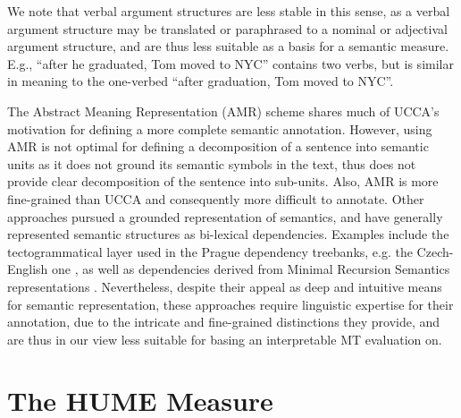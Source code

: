 \documentclass[11pt]{article}
\newcommand{\oa}[1]{\footnote{\color{red}OA: #1}}
\def\parcite#1{\cite{#1}}
\begin{document}
We note that verbal argument structures are less stable in this sense, as a verbal
argument structure may be translated or paraphrased to a nominal or adjectival
argument structure, and are thus less suitable as a basis for a semantic measure.
E.g., ``after he graduated, Tom moved to NYC'' contains two verbs,
but is similar in meaning to the one-verbed
``after graduation, Tom moved to NYC''. 


The Abstract Meaning Representation (AMR) scheme \cite{banarescu2013abstract}
shares much of UCCA's motivation for defining a more complete semantic annotation.
However, using AMR is not optimal for defining a decomposition of a sentence into semantic
units as it does not ground its semantic symbols in the text,
thus does not provide clear decomposition of the sentence into sub-units.
Also, AMR is more fine-grained than UCCA and consequently more difficult to annotate.
Other approaches pursued a grounded representation of semantics,
and have generally represented semantic structures as bi-lexical dependencies.
Examples include the tectogrammatical layer \parcite{sgallhp:1986} used in the Prague dependency
treebanks, e.g. the Czech-English one \parcite{hajic2012announcing}, as well
as dependencies derived from Minimal Recursion Semantics representations \parcite{oepen2006discriminant}.
Nevertheless, despite their appeal as deep and intuitive means for semantic representation,
these approaches require linguistic expertise for their annotation, due to the intricate and
fine-grained distinctions they provide, and are thus in our view less suitable for basing
an interpretable MT evaluation on. 



\section{The HUME Measure}\label{sec:hume}
\end{document}
